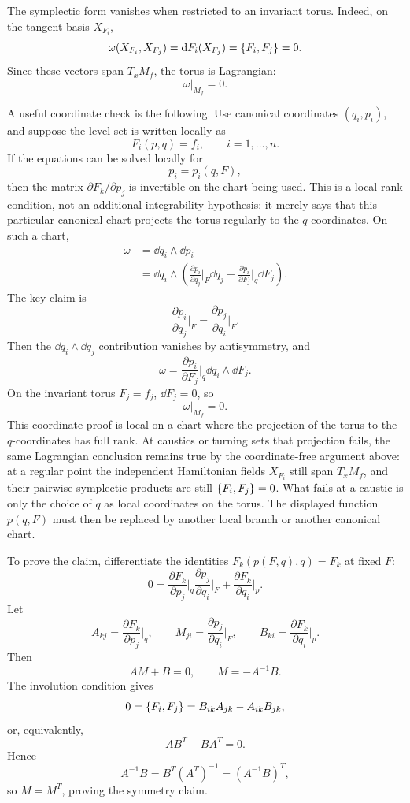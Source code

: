 The symplectic form vanishes when restricted to an invariant torus. Indeed, on
the tangent basis \(X_{F_i}\),
\[
  \omega(X_{F_i},X_{F_j})
  =
  \mathrm{d} F_i(X_{F_j})
  =
  \left\{F_i,F_j\right\}
  =
  0.
\]
Since these vectors span \(T_xM_f\), the torus is Lagrangian:
\[
  \omega|_{M_f}=0.
\]

\begin{derivation}
A useful coordinate check is the following. Use canonical
coordinates \((q_i,p_i)\), and suppose the level set is written locally as
\[
  F_i(p,q)=f_i,\qquad i=1,\ldots,n.
\]
If the equations can be solved locally for
\[
  p_i=p_i(q,F),
\]
then the matrix \(\partial F_k/\partial p_j\) is invertible on the chart being
used.  This is a local rank condition, not an additional integrability
hypothesis: it merely says that this particular canonical chart projects the
torus regularly to the \(q\)-coordinates. On such a chart,
\[
\begin{aligned}
  \omega
  &=
  \dd q_i\wedge\dd p_i\\
  &=
  \dd q_i\wedge
  \left(
    \frac{\partial p_i}{\partial q_j}\bigg|_F\dd q_j
    +
    \frac{\partial p_i}{\partial F_j}\bigg|_q\dd F_j
  \right).
\end{aligned}
\]
The key claim is
\[
  \frac{\partial p_i}{\partial q_j}\bigg|_F
  =
  \frac{\partial p_j}{\partial q_i}\bigg|_F.
\]
Then the \(\dd q_i\wedge\dd q_j\) contribution vanishes by antisymmetry, and
\[
  \omega=
  \frac{\partial p_i}{\partial F_j}\bigg|_q\dd q_i\wedge\dd F_j.
\]
On the invariant torus \(F_j=f_j\), \(\dd F_j=0\), so
\[
  \omega|_{M_f}=0.
\]
This coordinate proof is local on a chart where the projection of the torus to
the \(q\)-coordinates has full rank. At caustics or turning sets that
projection fails, the same Lagrangian conclusion remains true by the
coordinate-free argument above: at a regular point the independent Hamiltonian
fields \(X_{F_i}\) still span \(T_xM_f\), and their pairwise symplectic
products are still \(\left\{F_i,F_j\right\}=0\). What fails at a caustic is only
the choice of \(q\) as local coordinates on the torus. The displayed function
\(p(q,F)\) must then be replaced by another local branch or another canonical
chart.

To prove the claim, differentiate the identities \(F_k(p(F,q),q)=F_k\) at
fixed \(F\):
\[
  0=
  \frac{\partial F_k}{\partial p_j}\bigg|_q
  \frac{\partial p_j}{\partial q_i}\bigg|_F
  +
  \frac{\partial F_k}{\partial q_i}\bigg|_p.
\]
Let
\[
  A_{kj}=\frac{\partial F_k}{\partial p_j}\bigg|_q,\qquad
  M_{ji}=\frac{\partial p_j}{\partial q_i}\bigg|_F,\qquad
  B_{ki}=\frac{\partial F_k}{\partial q_i}\bigg|_p.
\]
Then
\[
  AM+B=0,\qquad M=-A^{-1}B.
\]
The involution condition gives
\[
  0=\left\{F_i,F_j\right\}
  =
  B_{ik}A_{jk}-A_{ik}B_{jk},
\]
or, equivalently,
\[
  AB^T-BA^T=0.
\]
Hence
\[
  A^{-1}B=B^T(A^T)^{-1}=(A^{-1}B)^T,
\]
so \(M=M^T\), proving the symmetry claim.
\end{derivation}

